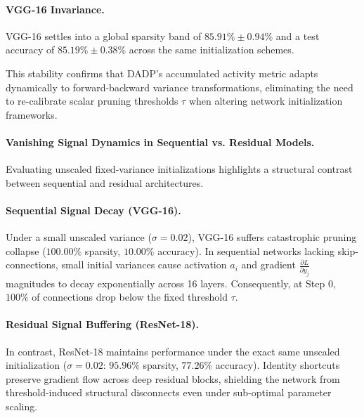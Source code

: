 \paragraph{VGG-16 Invariance.} VGG-16 settles into a global sparsity band of $85.91\% \pm 0.94\%$ and a test accuracy of $85.19\% \pm 0.38\%$ across the same initialization schemes.

This stability confirms that DADP’s accumulated activity metric adapts dynamically to forward-backward variance transformations, eliminating the need to re-calibrate scalar pruning thresholds $\tau$ when altering network initialization frameworks.

\paragraph{Vanishing Signal Dynamics in Sequential vs. Residual Models.}
Evaluating unscaled fixed-variance initializations highlights a structural contrast between sequential and residual architectures.

\paragraph{Sequential Signal Decay (VGG-16).} Under a small unscaled variance ($\sigma = 0.02$), VGG-16 suffers catastrophic pruning collapse ($100.00\%$ sparsity, $10.00\%$ accuracy). In sequential networks lacking skip-connections, small initial variances cause activation $a_i$ and gradient $\frac{\partial L}{\partial y_j}$ magnitudes to decay exponentially across 16 layers. Consequently, at Step 0, $100\%$ of connections drop below the fixed threshold $\tau$.

\paragraph{Residual Signal Buffering (ResNet-18).} In contrast, ResNet-18 maintains performance under the exact same unscaled initialization ($\sigma = 0.02$: $95.96\%$ sparsity, $77.26\%$ accuracy). Identity shortcuts preserve gradient flow across deep residual blocks, shielding the network from threshold-induced structural disconnects even under sub-optimal parameter scaling.